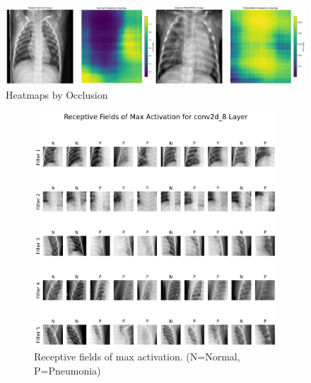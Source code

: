 \documentclass{article}
\begin{document}
\begin{figure}
  \centering
  \includegraphics[width=0.95\linewidth, angle=0]{occlusion.png}
  \caption{Heatmaps by Occlusion}
  \label{fig:occlusion}
\end{figure}

\begin{figure}
     \centering
     \begin{subfigure}[b]{0.25\textwidth}
         \centering
         \includegraphics[width=1.0\linewidth, angle=0]{receptive_fields.png}
          \caption{Receptive fields of max activation. (N=Normal, P=Pneumonia)}
          \label{fig:receptive_fields}
     \end{subfigure}
     \hfill
     \begin{subfigure}[b]{0.25\textwidth}
         \centering

\end{subfigure}
\end{figure}
\end{document}
